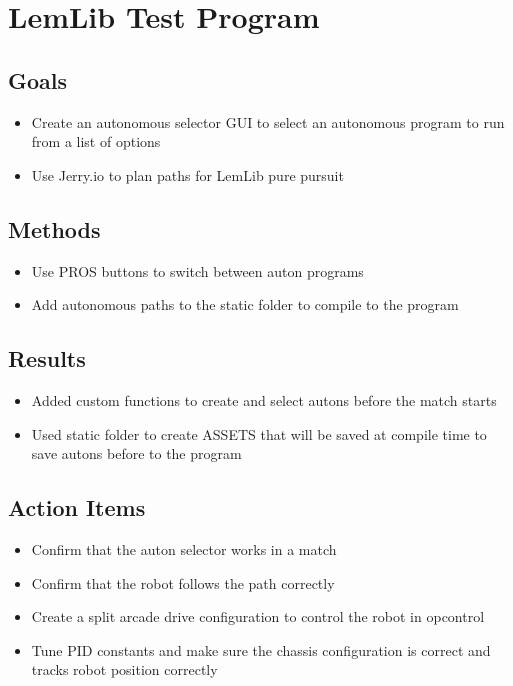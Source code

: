 \section{LemLib Test Program}

\subsection{Goals}
\begin{itemize}
    \item Create an autonomous selector GUI to select an autonomous program to run from a list of options
    \item Use Jerry.io to plan paths for LemLib pure pursuit
\end{itemize}

\subsection{Methods}
\begin{itemize}
    \item Use PROS buttons to switch between auton programs
    \item Add autonomous paths to the static folder to compile to the program
\end{itemize}

\subsection{Results}
\begin{itemize}
    \item Added custom functions to create and select autons before the match starts
    \item Used static folder to create ASSETS that will be saved at compile time to save autons before to the program
\end{itemize}

\subsection{Action Items}
\begin{itemize}
    \item Confirm that the auton selector works in a match
    \item Confirm that the robot follows the path correctly
    \item Create a split arcade drive configuration to control the robot in opcontrol
    \item Tune PID constants and make sure the chassis configuration is correct and tracks robot position correctly
\end{itemize}